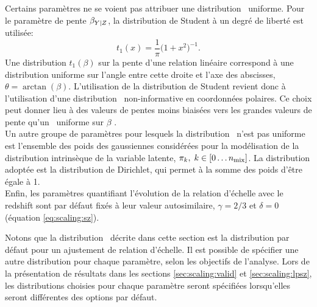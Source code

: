 Certains paramètres ne se voient pas attribuer une distribution \prior\ uniforme.
Pour le paramètre de pente $\beta_{Y|Z}$, la distribution de Student à un degré de liberté est utilisée:
\begin{equation}
    t_1(x) = \frac{1}{\pi} \big(1 + x^2\big)^{-1}.
\end{equation}
Une distribution $t_1(\beta)$ sur la pente d'une relation linéaire correspond à une distribution uniforme sur l'angle entre cette droite et l'axe des abscisses, $\theta = \arctan(\beta)$.
L'utilisation de la distribution de Student revient donc à l'utilisation d'une distribution \prior\ non-informative en coordonnées polaires.
Ce choix peut donner lieu à des valeurs de pentes moins biaisées vers les grandes valeurs de pente qu'un \prior\ uniforme sur $\beta$ \cite{andreon_measurement_2013,sereno_bayesian_2016}. \\
Un autre groupe de paramètres pour lesquels la distribution \prior\ n'est pas uniforme est l'ensemble des poids des gaussiennes considérées pour la modélisation de la distribution intrinsèque de la variable latente, $\pi_k,\; k \in [0\dots n_{\rm mix}]$.
La distribution adoptée est la distribution de Dirichlet, qui permet à la somme des poids d'être égale à 1. \\
Enfin, les paramètres quantifiant l'évolution de la relation d'échelle avec le redshift sont par défaut fixés à leur valeur autosimilaire, $\gamma=2/3$ et $\delta=0$ (équation \ref{eq:scaling:sz}).

Notons que la distribution \prior\ décrite dans cette section est la distribution par défaut pour un ajustement de relation d'échelle.
Il est possible de spécifier une autre distribution pour chaque paramètre, selon les objectifs de l'analyse.
Lors de la présentation de résultats dans les sections \ref{sec:scaling:valid} et \ref{sec:scaling:lpsz}, les distributions choisies pour chaque paramètre seront spécifiées lorsqu'elles seront différentes des options par défaut.

